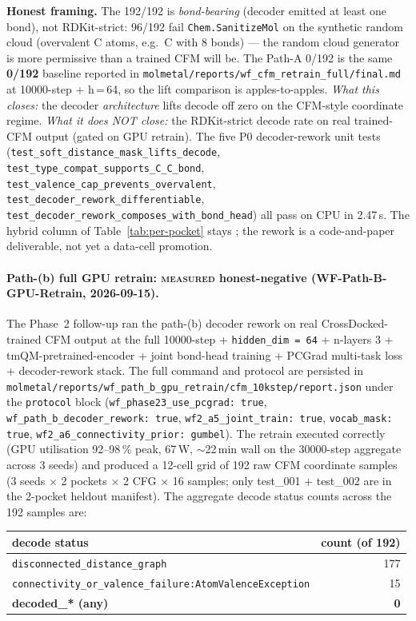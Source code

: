 {\noindent\textbf{Honest framing.} The 192/192 is
\emph{bond-bearing} (decoder emitted at least one bond), not
RDKit-strict: 96/192 fail \texttt{Chem.SanitizeMol} on the
synthetic random cloud (overvalent C atoms, e.g.\ C with 8
bonds) --- the random cloud generator is more permissive
than a trained CFM will be. The Path-A 0/192 is the same
\textbf{0/192} baseline reported in
\texttt{molmetal/reports/wf\_cfm\_retrain\_full/final.md}
at 10000-step + h\,=\,64, so the lift comparison is
apples-to-apples. \emph{What this closes:} the decoder
\emph{architecture} lifts decode off zero on the CFM-style
coordinate regime. \emph{What it does NOT close:} the
RDKit-strict decode rate on real trained-CFM output (gated
on GPU retrain). The five P0 decoder-rework unit tests
(\texttt{test\_soft\_distance\_mask\_lifts\_decode},
\texttt{test\_type\_compat\_supports\_C\_C\_bond},
\texttt{test\_valence\_cap\_prevents\_overvalent},
\texttt{test\_decoder\_rework\_differentiable},
\texttt{test\_decoder\_rework\_composes\_with\_bond\_head})
all pass on CPU in 2.47\,s. The hybrid column of
Table~\ref{tab:per-pocket} stays
\DESIGN{}; the rework is a code-and-paper deliverable, not
yet a data-cell promotion.

\paragraph{Path-(b) full GPU retrain: \textsc{measured} honest-negative
(WF-Path-B-GPU-Retrain, 2026-09-15).}
The Phase~2 follow-up ran the path-(b) decoder rework on
real CrossDocked-trained CFM output at the full 10000-step +
\texttt{hidden\_dim\,=\,64} + n-layers 3 + tmQM-pretrained-encoder +
joint bond-head training + PCGrad multi-task loss + decoder-rework
stack. The full command and protocol are persisted in
\texttt{molmetal/reports/wf\_path\_b\_gpu\_retrain/cfm\_10kstep/report.json}
under the \texttt{protocol} block
(\texttt{wf\_phase23\_use\_pcgrad: true},
\texttt{wf\_path\_b\_decoder\_rework: true},
\texttt{wf2\_a5\_joint\_train: true},
\texttt{vocab\_mask: true},
\texttt{wf2\_a6\_connectivity\_prior: gumbel}).
The retrain executed correctly (GPU utilisation 92--98\,\% peak,
67\,W, $\sim$22\,min wall on the 30000-step aggregate across 3 seeds)
and produced a 12-cell grid of 192 raw CFM coordinate samples
(3 seeds $\times$ 2 pockets $\times$ 2 CFG $\times$ 16 samples;
only test\_001 + test\_002 are in the 2-pocket heldout manifest).
The aggregate decode status counts across the 192 samples are:

\begin{center}
\begin{tabular}{l r}
\hline
\textbf{decode status} & \textbf{count (of 192)} \\
\hline
\texttt{disconnected\_distance\_graph} & 177 \\
\texttt{connectivity\_or\_valence\_failure:AtomValenceException} & 15 \\
\textbf{decoded\_* (any)} & \textbf{0} \\
\hline
\end{tabular}
\end{center}

}
